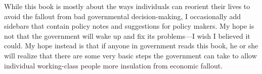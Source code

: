 \begin{infonote}
While this book is mostly about the ways individuals can reorient their
lives to avoid the fallout from bad governmental decision-making, I
occasionally add sidebars that contain policy notes
and suggestions for
policy makers. My hope is not that the government will wake up and fix
its problems—I wish I believed it could. My hope instead is that if
anyone in government reads this book, he or
she will realize that there are some very basic steps the government can
take to allow individual working-class people more insulation from
economic fallout. 
\end{infonote}

